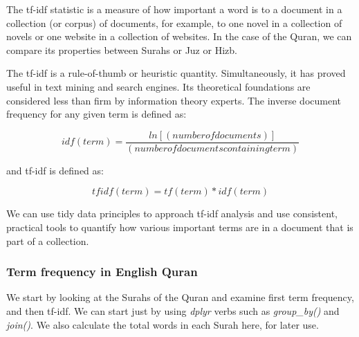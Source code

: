 \documentclass[
]{article}
\begin{document}
The tf-idf statistic is a measure of how important a word is to a document in a collection (or corpus) of documents, for example, to one novel in a collection of novels or one website in a collection of websites. In the case of the Quran, we can compare its properties between Surahs or Juz or Hizb.

The tf-idf is a rule-of-thumb or heuristic quantity. Simultaneously, it has proved useful in text mining and search engines. Its theoretical foundations are considered less than firm by information theory experts. The inverse document frequency for any given term is defined as:

\[idf(term) = \frac{ln[(number  of  documents)]}{(number  of  documents containing  term)}\]

and tf-idf is defined as:

\[tfidf(term) = tf(term) * idf(term)\]

We can use tidy data principles to approach tf-idf analysis and use consistent, practical tools to quantify how various important terms are in a document that is part of a collection.

\hypertarget{term-frequency-in-english-quran}{%
\subsubsection{Term frequency in English Quran}\label{term-frequency-in-english-quran}}

We start by looking at the Surahs of the Quran and examine first term frequency, and then tf-idf. We can start just by using \emph{dplyr} verbs such as \emph{group\_by()} and \emph{join()}. We also calculate the total words in each Surah here, for later use.

\footnotesize
\end{document}

